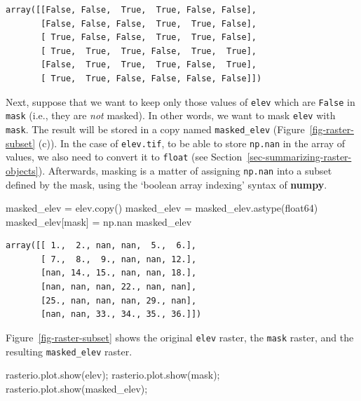 \documentclass[
  letterpaper,
]{krantz}
\newenvironment{Shaded}{\begin{snugshade}}{\end{snugshade}}
\newcommand{\NormalTok}[1]{\textcolor[rgb]{0.00,0.23,0.31}{#1}}
\newcommand{\OperatorTok}[1]{\textcolor[rgb]{0.37,0.37,0.37}{#1}}
\newcommand{\StringTok}[1]{\textcolor[rgb]{0.13,0.47,0.30}{#1}}
\begin{document}
\begin{verbatim}
array([[False, False,  True,  True, False, False],
       [False, False, False,  True,  True, False],
       [ True, False, False,  True,  True, False],
       [ True,  True,  True, False,  True,  True],
       [False,  True,  True,  True, False,  True],
       [ True,  True, False, False, False, False]])
\end{verbatim}

Next, suppose that we want to keep only those values of \texttt{elev}
which are \texttt{False} in \texttt{mask} (i.e., they are \emph{not}
masked). In other words, we want to mask \texttt{elev} with
\texttt{mask}. The result will be stored in a copy named
\texttt{masked\_elev} (Figure~\ref{fig-raster-subset} (c)). In the case
of \texttt{elev.tif}, to be able to store \texttt{np.nan} in the array
of values, we also need to convert it to \texttt{float} (see
Section~\ref{sec-summarizing-raster-objects}). Afterwards, masking is a
matter of assigning \texttt{np.nan} into a subset defined by the mask,
using the `boolean array indexing' syntax of \textbf{numpy}.

\begin{Shaded}
\begin{Highlighting}[]
\NormalTok{masked\_elev }\OperatorTok{=}\NormalTok{ elev.copy()}
\NormalTok{masked\_elev }\OperatorTok{=}\NormalTok{ masked\_elev.astype(}\StringTok{\textquotesingle{}float64\textquotesingle{}}\NormalTok{)}
\NormalTok{masked\_elev[mask] }\OperatorTok{=}\NormalTok{ np.nan}
\NormalTok{masked\_elev}
\end{Highlighting}
\end{Shaded}

\begin{verbatim}
array([[ 1.,  2., nan, nan,  5.,  6.],
       [ 7.,  8.,  9., nan, nan, 12.],
       [nan, 14., 15., nan, nan, 18.],
       [nan, nan, nan, 22., nan, nan],
       [25., nan, nan, nan, 29., nan],
       [nan, nan, 33., 34., 35., 36.]])
\end{verbatim}

Figure~\ref{fig-raster-subset} shows the original \texttt{elev} raster,
the \texttt{mask} raster, and the resulting \texttt{masked\_elev}
raster.

\begin{Shaded}
\begin{Highlighting}[]
\NormalTok{rasterio.plot.show(elev)}\OperatorTok{;}
\NormalTok{rasterio.plot.show(mask)}\OperatorTok{;}
\NormalTok{rasterio.plot.show(masked\_elev)}\OperatorTok{;}
\end{Highlighting}
\end{Shaded}
\end{document}
